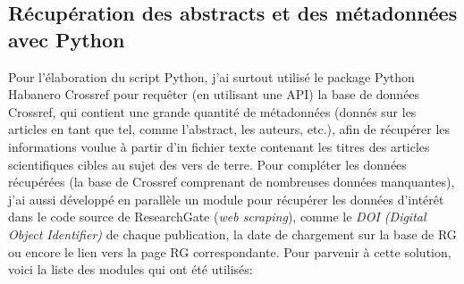 \documentclass{book}
\begin{document}
\subsection{Récupération des abstracts et des métadonnées avec Python}
\noindent
Pour l'élaboration du script Python, j'ai surtout utilisé le package Python Habanero Crossref pour requêter (en utilisant une API) la base de données Crossref, qui contient une grande
quantité de métadonnées (donnés sur les articles en tant que tel, comme
l'abstract, les auteurs, etc.), afin de récupérer les informations voulue à
partir d'in fichier texte contenant les titres des articles scientifiques cibles au sujet des vers de terre. Pour compléter les données récupérées (la base de
Crossref comprenant de nombreuses données manquantes), j'ai aussi développé en
parallèle un module pour récupérer les données d'intérêt dans le code source de
ResearchGate (\textit{web scraping}), comme le \textit{DOI (Digital Object Identifier)}
de chaque publication, la date de chargement sur la base de RG ou encore le
lien vers la page RG correspondante. Pour parvenir à cette solution, voici la liste des modules qui ont été utilisés:
\end{document}

